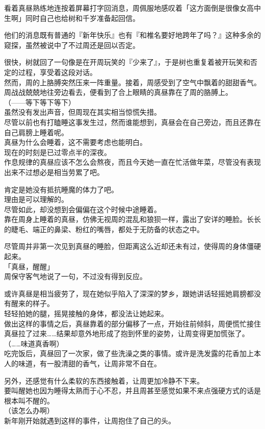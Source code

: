 看着真昼熟练地连按着屏幕打字回消息，周佩服地感叹着「这方面倒是很像女高中生啊」同时自己也给树和千岁准备起回信。

他们的消息既有普通的『新年快乐』也有『和椎名要好地跨年了吗？』这种多余的窥探，虽然被说中了不过周还是回以否定。

很快，树就回了一句像是在开周玩笑的『少来了』，于是树也重复着被开玩笑和否定的过程，享受着这段对话。\\

然而，周的上胳膊突然压来一阵重量。接着，周感受到了空气中飘着的甜甜香气。\\

周战战兢兢地往旁边看去，便看到了合上眼睛的真昼靠在了周的胳膊上。\\

（——等下等下等下）\\

虽然没有发出声音，但周现在其实相当惊慌失措。\\

尽管以前也有打瞌睡这事发生过，然而谁能想到，真昼会在自己旁边，而且还靠在自己肩膀上睡着呢。\\

真昼为什么会睡着，这不需要考虑也能明白。\\

现在的时刻是已过零点半的深夜。\\

作息规律的真昼应该不怎么会熬夜，而且今天她一直在忙活做年菜，尽管没有表现出来不过想必是相当劳累了吧。

肯定是她没有抵抗睡魔的体力了吧。\\

理由是可以理解的。\\

尽管如此，却没想到会偏偏在这个时候中途睡着。\\

靠在周身上睡着的真昼，仿佛无视周的混乱和狼狈一样，露出了安详的睡脸。长长的睫毛、端正的鼻梁、粉红的嘴唇，都处于无防备的状态之中。

尽管周并非第一次见到真昼的睡脸，但距离这么近却还未有过，使得周的身体僵硬起来。\\

「真昼，醒醒」\\

周保守客气地说了一句，不过没有得到反应。

或许真昼是相当疲劳了，现在她似乎陷入了深深的梦乡，跟她讲话轻摇她肩膀都没有醒来的样子。\\

轻轻拍她的腿，摇晃接触的身体，都没法让她起来。\\

做出这样的事情之后，真昼靠着的部分偏移了一点，开始往前倾斜，周便慌忙接住真昼拉了过来……结果却意外地形成了抱到怀里的姿势，让周变得更加慌张了。\\

（……味道真香啊）\\

吃完饭后，真昼回了一次家，做了些洗澡之类的事情。或许是洗发露的花香加上本人的味道，有一股清甜的香气，让周非常不自在。

另外，还感觉有什么柔软的东西接触着，让周更加冷静不下来。\\

要叫醒她也因为睡得太熟而于心不忍，并且周甚至感觉如果不来点强硬方式的话是根本叫不醒的。\\

（该怎么办啊）\\

新年刚开始就遇到这样的事件，让周抱住了自己的头。
